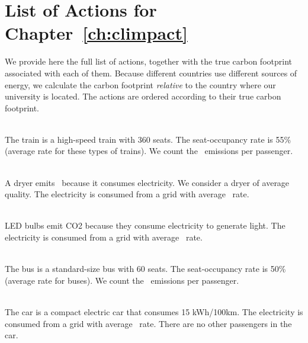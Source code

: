 \section{List of Actions for Chapter~\ref{ch:climpact}}
\label{clm:app:actions}

We provide here the full list of actions, together with the true carbon footprint associated with each of them.
Because different countries use different sources of energy, we calculate the carbon footprint \textit{relative} to the country where our university is located.
The actions are ordered according to their true carbon footprint.
\begin{enumerateb}
	\item {} \\
	The train is a high-speed train with 360 seats.
	The seat-occupancy rate is 55\% (average rate for these types of trains).
	We count the \COtwo\ emissions per passenger. \\
	\item {} \\
	A dryer emits \COtwo\ because it consumes electricity.
	We consider a dryer of average quality.
	The electricity is consumed from a grid with average \COtwo\ rate. \\
	\item {} \\
	LED bulbs emit CO2 because they consume electricity to generate light.
	The electricity is consumed from a grid with average \COtwo\ rate. \\
	\item {} \\
	The bus is a standard-size bus with 60 seats.
	The seat-occupancy rate is 50\% (average rate for buses).
	We count the \COtwo\ emissions per passenger. \\
	\item {} \\
	The car is a compact electric car that consumes 15 kWh/100km.
	The electricity is consumed from a grid with average \COtwo\ rate.
	There are no other passengers in the car.

\end{enumerateb}
